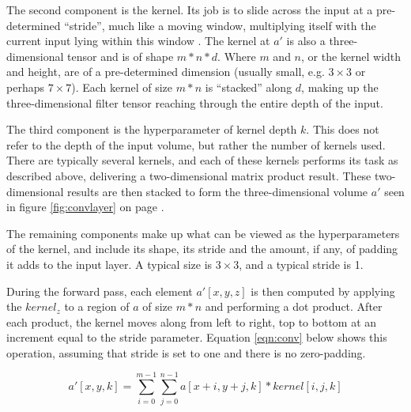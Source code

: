 The second component is the kernel. Its job is to slide across the input at a pre-determined ``stride'', much like a moving window, multiplying itself with the current input lying within this window \cite{convnets}. The kernel at $a'$ is also a three-dimensional tensor and is of shape $m*n*d$. Where $m$ and $n$, or the kernel width and height, are of a pre-determined dimension (usually small, e.g. $3\times3$ or perhaps $7\times7$). Each kernel of size $m*n$ is ``stacked'' along $d$, making up the three-dimensional filter tensor reaching through the entire depth of the input.

The third component is the hyperparameter of kernel depth $k$. This does not refer to the depth of the input volume, but rather the number of kernels used. There are typically several kernels, and each of these kernels performs its task as described above, delivering a two-dimensional matrix product result. These two-dimensional results are then stacked to form the three-dimensional volume $a'$ seen in figure \ref{fig:convlayer} on page \pageref{fig:convlayer}.


The remaining components make up what can be viewed as the hyperparameters of the kernel, and include its shape, its stride and the amount, if any, of padding it adds to the input layer. A typical size is $3\times3$, and a typical stride is 1.

During the forward pass, each element $a'[x,y,z]$ is then computed by applying the $kernel_{z}$ to a region of $a$ of size $m*n$ and performing a dot product. After each product, the kernel moves along from left to right, top to bottom at an increment equal to the stride parameter. Equation \ref{eqn:conv} below shows this operation, assuming that stride is set to one and there is no zero-padding.

\begin{equation}
\label{eqn:conv}
a'[x,y,k] = \sum_{i=0}^{m-1}\sum_{j=0}^{n-1}{a[x+i,y+j,k] * kernel[i,j,k]}
\end{equation}

